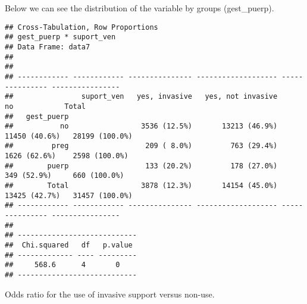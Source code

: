 \documentclass[
]{article}
\newenvironment{Shaded}{\begin{snugshade}}{\end{snugshade}}
\newcommand{\CommentTok}[1]{\textcolor[rgb]{0.56,0.35,0.01}{\textit{#1}}}
\newcommand{\DataTypeTok}[1]{\textcolor[rgb]{0.13,0.29,0.53}{#1}}
\newcommand{\KeywordTok}[1]{\textcolor[rgb]{0.13,0.29,0.53}{\textbf{#1}}}
\newcommand{\NormalTok}[1]{#1}
\newcommand{\OperatorTok}[1]{\textcolor[rgb]{0.81,0.36,0.00}{\textbf{#1}}}
\newcommand{\OtherTok}[1]{\textcolor[rgb]{0.56,0.35,0.01}{#1}}
\newcommand{\StringTok}[1]{\textcolor[rgb]{0.31,0.60,0.02}{#1}}
\begin{document}
Below we can see the distribution of the variable by groups
(gest\_puerp).

\begin{Shaded}
\end{Shaded}

\begin{verbatim}
## Cross-Tabulation, Row Proportions  
## gest_puerp * suport_ven  
## Data Frame: data7  
## 
## 
## ------------ ------------ --------------- ------------------- --------------- ----------------
##                suport_ven   yes, invasive   yes, not invasive              no            Total
##   gest_puerp                                                                                  
##           no                 3536 (12.5%)       13213 (46.9%)   11450 (40.6%)   28199 (100.0%)
##         preg                  209 ( 8.0%)         763 (29.4%)    1626 (62.6%)    2598 (100.0%)
##        puerp                  133 (20.2%)         178 (27.0%)     349 (52.9%)     660 (100.0%)
##        Total                 3878 (12.3%)       14154 (45.0%)   13425 (42.7%)   31457 (100.0%)
## ------------ ------------ --------------- ------------------- --------------- ----------------
## 
## ----------------------------
##  Chi.squared   df   p.value 
## ------------- ---- ---------
##     568.6      4       0    
## ----------------------------
\end{verbatim}

Odds ratio for the use of invasive support versus non-use.

\begin{Shaded}
\end{Shaded}
\end{document}

